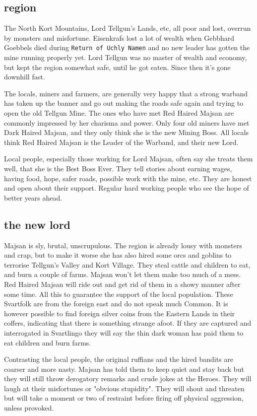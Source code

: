 \subsection*{region}
The North Kort Mountains, Lord Tellgun's Lands, etc, all poor and lost, overrun by monsters and misfortune. Eisenkrafs lost a lot of wealth when Gebbhard Goebbels died during \texttt{Return of Uchly Namen} and no new leader has gotten the mine running properly yet. Lord Tellgun was no master of wealth and economy, but kept the region somewhat safe, until he got eaten. Since then it's gone downhill fast.

The locals, miners and farmers, are generally very happy that a strong warband has taken up the banner and go out making the roads safe again and trying to open the old Tellgun Mine. The ones who have met Red Haired Majsan are commonly impressed by her charisma and power. Only four old miners have met Dark Haired Majsan, and they only think she is the new Mining Boss. All locals think Red Haired Majsan is the Leader of the Warband, and their new Lord.

Local people, especially those working for Lord Majsan, often say she treats them well, that she is the Best Boss Ever. They tell stories about earning wages, having food, hope, safer roads, possible work with the mine, etc. They are honest and open about their support. Regular hard working people who see the hope of better years ahead.


\subsection*{the new lord}
Majsan is sly, brutal, unscrupulous. The region is already lousy with monsters and crap, but to make it worse she has also hired some orcs and goblins to terrorise Tellgun's Valley and Kort Village. They steal cattle and children to eat, and burn a couple of farms. Majsan won't let them make too much of a mess. Red Haired Majsan will ride out and get rid of them in a showy manner after some time. All this to guarantee the support of the local population. These Svartfolk are from the foreign east and do not speak much Common. It is however possible to find foreign silver coins from the Eastern Lands in their coffers, indicating that there is something strange afoot. If they are captured and interrogated in Svartlingo they will say the thin dark woman has paid them to eat children and burn farms.

Contrasting the local people, the original ruffians and the hired bandits are coarser and more nasty. Majsan has told them to keep quiet and stay back but they will still throw derogatory remarks and crude jokes at the Heroes. They will laugh at their misfortunes or "obvious stupidity". They will shout and threaten but will take a moment or two of restraint before firing off physical aggression, unless provoked.


